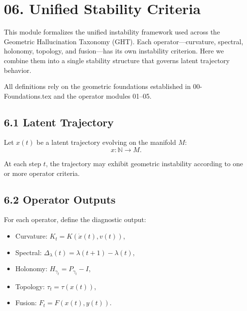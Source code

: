 
\section*{06. Unified Stability Criteria}

This module formalizes the unified instability framework used across the
Geometric Hallucination Taxonomy (GHT). Each operator—curvature, spectral,
holonomy, topology, and fusion—has its own instability criterion. Here we
combine them into a single stability structure that governs latent
trajectory behavior.

All definitions rely on the geometric foundations established in
00-Foundations.tex and the operator modules 01–05.

\subsection*{6.1 Latent Trajectory}

Let $x(t)$ be a latent trajectory evolving on the manifold $M$:
\[
x : \mathbb{N} \to M.
\]

At each step $t$, the trajectory may exhibit geometric instability
according to one or more operator criteria.

\subsection*{6.2 Operator Outputs}

For each operator, define the diagnostic output:

\begin{itemize}
\item Curvature: $K_t = K(\dot{x}(t), v(t))$,
\item Spectral: $\Delta_\lambda(t) = \lambda(t+1) - \lambda(t)$,
\item Holonomy: $H_{\gamma_t} = P_{\gamma_t} - I$,
\item Topology: $\tau_t = \tau(x(t))$,
\item Fusion: $F_t = F(x(t), y(t))$.
\end{itemize}

